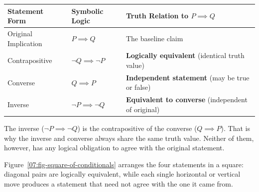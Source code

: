 \begin{center}
\small
\begin{tabular}{lll}
\toprule
\textbf{Statement Form} & \textbf{Symbolic Logic} & \textbf{Truth Relation to $P \implies Q$} \\
\midrule
Original Implication & $P \implies Q$ & The baseline claim \\
Contrapositive & $\neg Q \implies \neg P$ & \textbf{Logically equivalent} (identical truth value) \\
Converse & $Q \implies P$ & \textbf{Independent statement} (may be true or false) \\
Inverse & $\neg P \implies \neg Q$ & \textbf{Equivalent to converse} (independent of original) \\
\bottomrule
\end{tabular}
\end{center}

The inverse ($\neg P \implies \neg Q$) is the contrapositive of the converse ($Q \implies P$). That is why the inverse and converse always share the same truth value. Neither of them, however, has any logical obligation to agree with the original statement.

Figure~\ref{07:fig-square-of-conditionals} arranges the four statements in a square: diagonal pairs are logically equivalent, while each single horizontal or vertical move produces a statement that need not agree with the one it came from.

